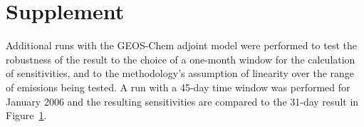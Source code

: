\section{Supplement}

Additional runs with the GEOS-Chem adjoint model were performed to test the robustness of the result to the choice of a one-month window for the calculation of sensitivities, and to the methodology's assumption of linearity over the range of emissions being tested. A run with a 45-day time window was performed for January 2006 and the resulting sensitivities are compared to the 31-day result in Figure~\ref{}.
